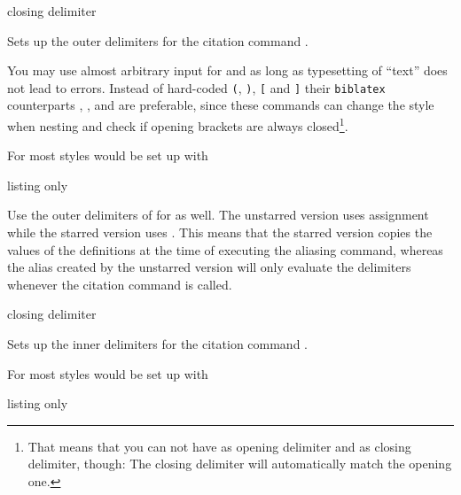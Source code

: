 \documentclass{ltxdockit}
\def\sty{\texttt}
\begin{document}
\begin{ltxsyntax}
        {closing delimiter}

Sets up the outer delimiters for the citation command
.

You may use almost arbitrary input for  and
 as long as typesetting of
\enquote{text} does not lead to
errors.
Instead of hard-coded \texttt{(}, \texttt{)}, \texttt{[} and \texttt{]} their
\sty{biblatex} counterparts , ,
 and  are preferable, since these
commands can change the style when nesting and check if opening brackets
are always closed\footnote{That means that you can not have 
as opening delimiter and  as closing delimiter, though:
The closing delimiter will automatically match the opening one.}.

For most styles  would be set up with
\begin{tcblisting}{listing only}
\end{tcblisting}


Use the outer delimiters of  for
 as well.
The unstarred version uses  assignment while the starred version uses
. This means that the starred version copies the values of the
definitions at the time of executing the aliasing command,
whereas the alias created by the unstarred version will only evaluate the
delimiters whenever the citation command is called.


        {closing delimiter}

Sets up the inner delimiters for the citation command
.

For most styles  would be set up with
\begin{tcblisting}{listing only}
\end{tcblisting}


\end{ltxsyntax}
\end{document}

